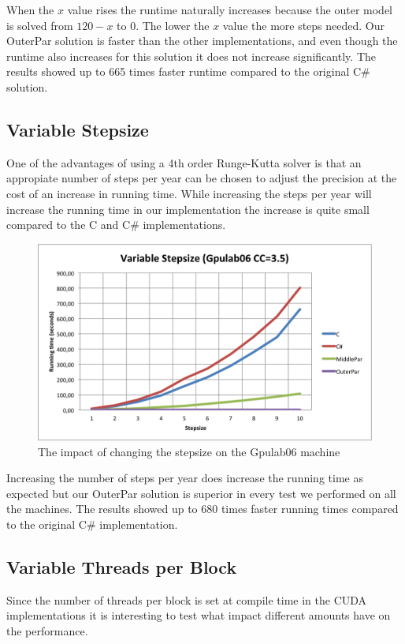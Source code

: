 When the $x$ value rises the runtime naturally increases because the outer model is solved from $120-x$ to 0. The lower the $x$ value the more steps needed. Our OuterPar solution is faster than the other implementations, and even though the runtime also increases for this solution it does not increase significantly. The results showed up to 665 times faster runtime compared to the original C\# solution.

\subsection{Variable Stepsize}
One of the advantages of using a 4th order Runge-Kutta solver is that an appropiate number of steps per year can be chosen to adjust the precision at the cost of an increase in running time. While increasing the steps per year will increase the running time in our implementation the increase is quite small compared to the C and C\# implementations.

\begin{figure}
\begin{center}
	\includegraphics[width=\textwidth]{img/Gpulab-stepsize35.png}
\end{center}
\caption{The impact of changing the stepsize on the Gpulab06 machine}
\label{variablestepsize}
\end{figure}

Increasing the number of steps per year does increase the running time as expected but our OuterPar solution is superior in every test we performed on all the machines. The results showed up to 680 times faster running times compared to the original C\# implementation.

\subsection{Variable Threads per Block}
Since the number of threads per block is set at compile time in the CUDA implementations it is interesting to test what impact different amounts have on the performance.

